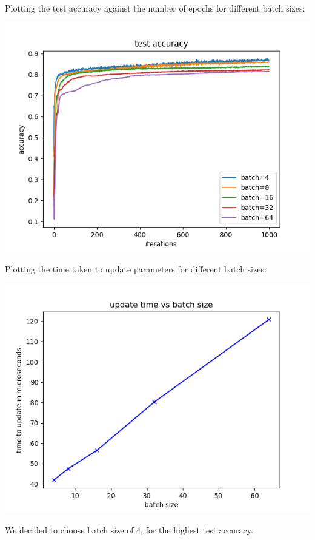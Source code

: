Plotting the test accuracy against the number of epochs for different
batch sizes:

\begin{center}
    \includegraphics[width=\imgw]{images/p1a2_batch_accuracy.png}   
\end{center}

Plotting the time taken to update parameters for different batch sizes:

\begin{center}
    \includegraphics[width=\imgw]{images/p1a2_batch_times.png}   
\end{center}

We decided to choose batch size of 4, for the highest test accuracy. 

